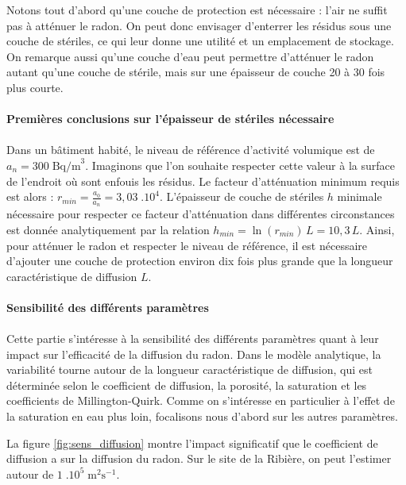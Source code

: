 \documentclass{article}
\begin{document}
Notons tout d’abord qu’une couche de protection est nécessaire : l’air ne suffit pas à atténuer le radon. On peut donc envisager d’enterrer les résidus sous une couche de stériles, ce qui leur donne une utilité et un emplacement de stockage. On remarque aussi qu’une couche d’eau peut permettre d’atténuer le radon autant qu’une couche de stérile, mais sur une épaisseur de couche 20 à 30 fois plus courte.

\paragraph{Premières conclusions sur l'épaisseur de stériles nécessaire}

\paragraph{} Dans un bâtiment habité, le niveau de référence d’activité volumique est de $a_n=300 \; \text{Bq/m}^3$. Imaginons que l’on souhaite respecter cette valeur à la surface de l’endroit où sont enfouis les résidus. Le facteur d’atténuation minimum requis est alors : $r_{min}=\frac{a_0}{a_n} =3,03 \; .10^4$. L’épaisseur de couche de stériles $h$ minimale nécessaire pour respecter ce facteur d’atténuation dans différentes circonstances est donnée analytiquement par la relation $h_{min}=\ln(r_{min}) \,L =10,3 \,L $. Ainsi, pour atténuer le radon et respecter le niveau de référence, il est nécessaire d’ajouter une couche de protection environ dix fois plus grande que la longueur caractéristique de diffusion $L$.

\paragraph{Sensibilité des différents paramètres}
\paragraph{} Cette partie s'intéresse à la sensibilité des différents paramètres quant à leur impact sur l'efficacité de la diffusion du radon. Dans le modèle analytique, la variabilité tourne autour de la longueur caractéristique de diffusion, qui est déterminée selon le coefficient de diffusion, la porosité, la saturation et les coefficients de Millington-Quirk. Comme on s'intéresse en particulier à l'effet de la saturation en eau plus loin, focalisons nous d'abord sur les autres paramètres.

La figure \ref{fig:sens_diffusion} montre l'impact significatif que le coefficient de diffusion a sur la diffusion du radon. Sur le site de la Ribière, on peut l'estimer autour de $1 \; .10^5 \; \text{m}^2 \text{s}^{-1}$.
\end{document}
